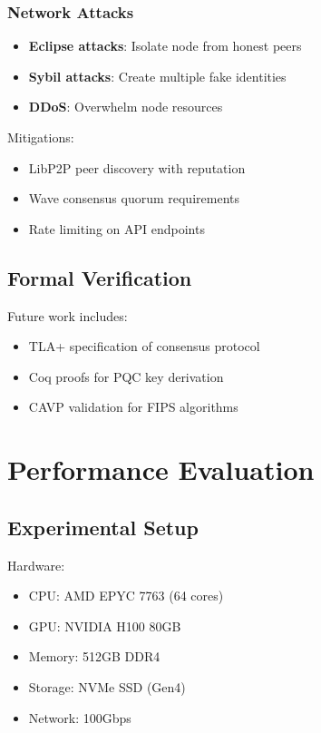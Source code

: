 \documentclass[11pt,twocolumn]{article}
\begin{document}
\subsubsection{Network Attacks}

\begin{itemize}
\item \textbf{Eclipse attacks}: Isolate node from honest peers
\item \textbf{Sybil attacks}: Create multiple fake identities
\item \textbf{DDoS}: Overwhelm node resources
\end{itemize}

Mitigations:
\begin{itemize}
\item LibP2P peer discovery with reputation
\item Wave consensus quorum requirements
\item Rate limiting on API endpoints
\end{itemize}

\subsection{Formal Verification}

Future work includes:
\begin{itemize}
\item TLA+ specification of consensus protocol
\item Coq proofs for PQC key derivation
\item CAVP validation for FIPS algorithms
\end{itemize}

\section{Performance Evaluation}

\subsection{Experimental Setup}

Hardware:
\begin{itemize}
\item CPU: AMD EPYC 7763 (64 cores)
\item GPU: NVIDIA H100 80GB
\item Memory: 512GB DDR4
\item Storage: NVMe SSD (Gen4)
\item Network: 100Gbps
\end{itemize}
\end{document}

